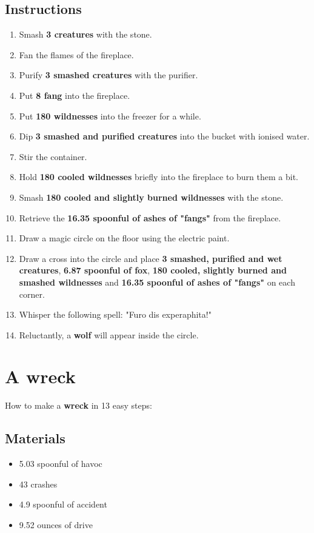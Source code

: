 \documentclass{article}
\begin{document}
\subsection{Instructions}\begin{enumerate}
\item 
Smash \textbf{3 creatures} with the stone.
\item 
Fan the flames of the fireplace.
\item 
Purify \textbf{3 smashed creatures} with the purifier.
\item 
Put \textbf{8 fang} into the fireplace.
\item 
Put \textbf{180 wildnesses} into the freezer for a while.
\item 
Dip \textbf{3 smashed and purified creatures} into the bucket with ionised water.
\item 
Stir the container.
\item 
Hold \textbf{180 cooled wildnesses} briefly into the fireplace to burn them a bit.
\item 
Smash \textbf{180 cooled and slightly burned wildnesses} with the stone.
\item 
Retrieve the \textbf{16.35 spoonful of ashes of "fangs"} from the fireplace.
\item 
Draw a magic circle on the floor using the electric paint.
\item 
Draw a cross into the circle and place \textbf{3 smashed, purified and wet creatures}, \textbf{6.87 spoonful of fox}, \textbf{180 cooled, slightly burned and smashed wildnesses} and \textbf{16.35 spoonful of ashes of "fangs"} on each corner.
\item 
Whisper the following spell: "Furo dis experaphita!"
\item 
Reluctantly, a \textbf{wolf} will appear inside the circle.
\end{enumerate}
\newpage
\section{A wreck}How to make a \textbf{wreck} in 13 easy steps:

\subsection{Materials}\begin{itemize}
\item 
5.03 spoonful of havoc
\item 
43 crashes
\item 
4.9 spoonful of accident
\item 
9.52 ounces of drive
\end{itemize}
\end{document}
